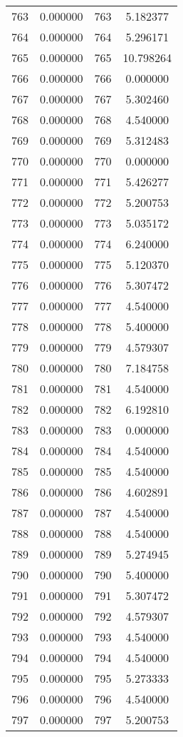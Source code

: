\documentclass[12pt]{article}
\begin{document}
\begin{longtable}{@{}cccc@{}}
763 & 0.000000 & 763 & 5.182377 \\
764 & 0.000000 & 764 & 5.296171 \\
765 & 0.000000 & 765 & 10.798264 \\
766 & 0.000000 & 766 & 0.000000 \\
767 & 0.000000 & 767 & 5.302460 \\
768 & 0.000000 & 768 & 4.540000 \\
769 & 0.000000 & 769 & 5.312483 \\
770 & 0.000000 & 770 & 0.000000 \\
771 & 0.000000 & 771 & 5.426277 \\
772 & 0.000000 & 772 & 5.200753 \\
773 & 0.000000 & 773 & 5.035172 \\
774 & 0.000000 & 774 & 6.240000 \\
775 & 0.000000 & 775 & 5.120370 \\
776 & 0.000000 & 776 & 5.307472 \\
777 & 0.000000 & 777 & 4.540000 \\
778 & 0.000000 & 778 & 5.400000 \\
779 & 0.000000 & 779 & 4.579307 \\
780 & 0.000000 & 780 & 7.184758 \\
781 & 0.000000 & 781 & 4.540000 \\
782 & 0.000000 & 782 & 6.192810 \\
783 & 0.000000 & 783 & 0.000000 \\
784 & 0.000000 & 784 & 4.540000 \\
785 & 0.000000 & 785 & 4.540000 \\
786 & 0.000000 & 786 & 4.602891 \\
787 & 0.000000 & 787 & 4.540000 \\
788 & 0.000000 & 788 & 4.540000 \\
789 & 0.000000 & 789 & 5.274945 \\
790 & 0.000000 & 790 & 5.400000 \\
791 & 0.000000 & 791 & 5.307472 \\
792 & 0.000000 & 792 & 4.579307 \\
793 & 0.000000 & 793 & 4.540000 \\
794 & 0.000000 & 794 & 4.540000 \\
795 & 0.000000 & 795 & 5.273333 \\
796 & 0.000000 & 796 & 4.540000 \\
797 & 0.000000 & 797 & 5.200753 \\

\end{longtable}
\end{document}
